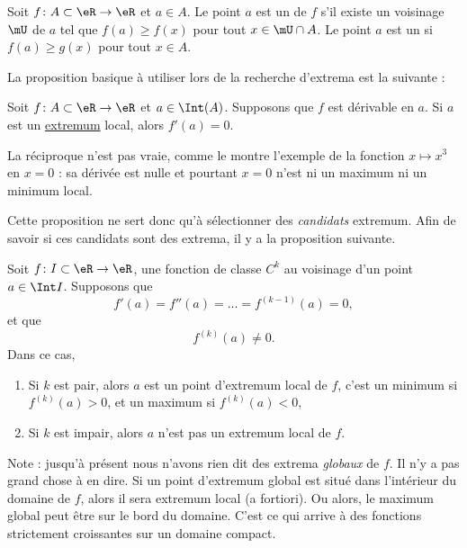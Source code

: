 \begin{definition}
Soit $f\colon A\subset \eR\to \eR$ et $a\in A$. Le point $a$ est un  de $f$ s'il existe un voisinage $\mU$ de $a$ tel que $f(a)\geq f(x)$ pour tout $x\in\mU\cap A$. Le point $a$ est un  si $f(a)\geq g(x)$ pour tout $x\in A$.
\end{definition}

La proposition basique à utiliser lors de la recherche d'extrema est la suivante :
\begin{proposition}     \label{PROPooNVKXooXtKkuz}
Soit $f\colon A\subset\eR\to \eR$ et $a\in\Int(A)$. Supposons que $f$ est dérivable en $a$. Si $a$ est un \href{http://fr.wikipedia.org/wiki/Extremum}{extremum} local, alors $f'(a)=0$.
\end{proposition}

La réciproque n'est pas vraie, comme le montre l'exemple de la fonction $x\mapsto x^3$ en $x=0$ : sa dérivée est nulle et pourtant $x=0$ n'est ni un maximum ni un minimum local. 

Cette proposition ne sert donc qu'à sélectionner des \emph{candidats} extremum. Afin de savoir si ces candidats sont des extrema, il y a la proposition suivante.
\begin{proposition}
Soit $f\colon I\subset \eR\to \eR$, une fonction de classe $C^k$ au voisinage d'un point $a\in\Int I$. Supposons que
\begin{equation}
    f'(a)=f''(a)=\ldots=f^{(k-1)}(a)=0,
\end{equation}
et que
\begin{equation}
    f^{(k)}(a)\neq 0.
\end{equation}
Dans ce cas,
\begin{enumerate}

\item
Si $k$ est pair, alors $a$ est un point d'extremum local de $f$, c'est un minimum si $f^{(k)}(a)>0$, et un maximum si $f^{(k)}(a)<0$,
\item
Si $k$ est impair, alors $a$ n'est pas un extremum local de $f$.

\end{enumerate}
\end{proposition}

Note : jusqu'à présent nous n'avons rien dit des extrema \emph{globaux} de $f$. Il n'y a pas grand chose à en dire. Si un point d'extremum global est situé dans l'intérieur du domaine de $f$, alors il sera extremum local (a fortiori). Ou alors, le maximum global peut être sur le bord du domaine. C'est ce qui arrive à des fonctions strictement croissantes sur un domaine compact.

